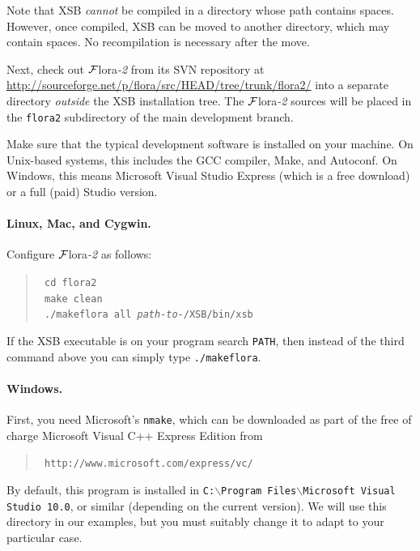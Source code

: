\documentclass[11pt]{article}
\newcommand{\FLSYSTEM}{{\mbox{\sc ${\cal F}${lora}\rm\emph{-2}}}\xspace}
\begin{document}
{Note that XSB \emph{cannot} be compiled in a directory whose path contains
spaces.  However, once compiled, XSB can be moved to another directory,
which may contain spaces. No recompilation is necessary after the move.

\sloppy
Next, check out \FLSYSTEM from its SVN repository at
\url{http://sourceforge.net/p/flora/src/HEAD/tree/trunk/flora2/} into a
separate directory \emph{outside} the XSB installation tree.  The \FLSYSTEM
sources will be placed in the {\tt flora2} subdirectory of the main
development branch.

Make sure that the typical development software is installed on your
machine. On Unix-based systems, this includes the GCC compiler, Make, and
Autoconf. On Windows, this means Microsoft Visual Studio Express (which is
a free download) or a full (paid) Studio version.

\paragraph{Linux, Mac, and Cygwin.}
Configure \FLSYSTEM as follows:
\begin{quote}
  \tt
   cd flora2\\
   \tt
   make clean\\
   \tt
   ./makeflora all \textnormal{\emph{path-to-}}/XSB/bin/xsb
\end{quote}
If the XSB executable is on your program search {\tt PATH}, then instead of the
third command above you can simply type
\texttt{./makeflora}. 

\paragraph{Windows.}
First, you need Microsoft's {\tt nmake}, which can be downloaded as
part of the free of charge Microsoft Visual C++ Express Edition from
\begin{quote}
\tt
  http://www.microsoft.com/express/vc/ 
\end{quote}
By default, this program is installed in
\texttt{C:$\backslash$Program Files$\backslash$Microsoft Visual Studio 10.0},
or similar (depending on the current version).
We will use this directory in our examples, but you must suitably 
change it to adapt to your particular case.

}
\end{document}

